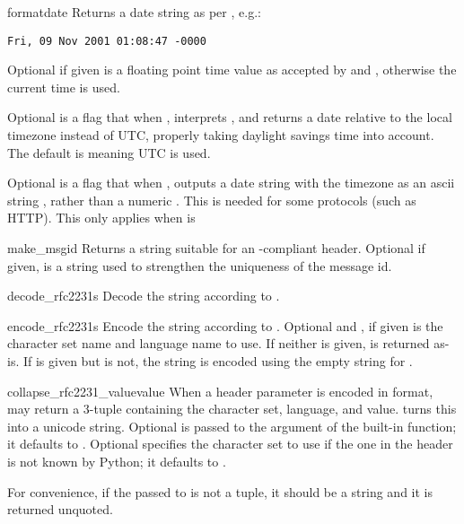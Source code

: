 \begin{funcdesc}{formatdate}{}
Returns a date string as per , e.g.:

\begin{verbatim}
Fri, 09 Nov 2001 01:08:47 -0000
\end{verbatim}

Optional  if given is a floating point time value as
accepted by  and ,
otherwise the current time is used.

Optional  is a flag that when , interprets
, and returns a date relative to the local timezone
instead of UTC, properly taking daylight savings time into account.
The default is  meaning UTC is used.

Optional  is a flag that when , outputs a 
date string with the timezone as an ascii string , rather
than a numeric . This is needed for some protocols (such
as HTTP). This only applies when  is 
\end{funcdesc}

\begin{funcdesc}{make_msgid}{}
Returns a string suitable for an -compliant
 header.  Optional  if given, is
a string used to strengthen the uniqueness of the message id.
\end{funcdesc}

\begin{funcdesc}{decode_rfc2231}{s}
Decode the string  according to .
\end{funcdesc}

\begin{funcdesc}{encode_rfc2231}{s}
Encode the string  according to .  Optional
 and , if given is the character set name
and language name to use.  If neither is given,  is returned
as-is.  If  is given but  is not, the
string is encoded using the empty string for .
\end{funcdesc}

\begin{funcdesc}{collapse_rfc2231_value}{value}
When a header parameter is encoded in  format,
 may return a 3-tuple containing the character
set, language, and value.   turns this into
a unicode string.  Optional  is passed to the 
argument of the built-in  function; it defaults to
.  Optional  specifies the character set
to use if the one in the  header is not known by Python; it defaults
to .

For convenience, if the  passed to
 is not a tuple, it should be a string and
it is returned unquoted.
\end{funcdesc}

